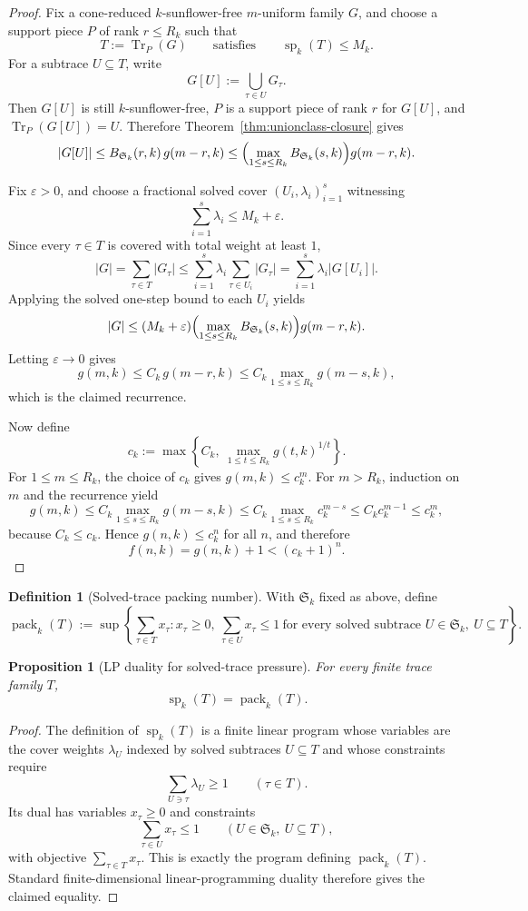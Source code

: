 \documentclass[11pt]{article}
\newtheorem{proposition}[theorem]{Proposition}
\theoremstyle{definition}
\newtheorem{definition}[theorem]{Definition}
\newcommand{\Tr}{\operatorname{Tr}}
\newcommand{\eps}{\varepsilon}
\newcommand{\1}{\mathbf{1}}
\begin{document}
\begin{proof}
Fix a cone-reduced $k$-sunflower-free $m$-uniform family $G$, and choose a support piece $P$ of rank $r\le R_k$ such that
\[
T:=\Tr_P(G)
\qquad\text{satisfies}\qquad
\operatorname{sp}_k(T)\le M_k.
\]
For a subtrace $U\subseteq T$, write
\[
G[U]:=\bigcup_{\tau\in U} G_\tau.
\]
Then $G[U]$ is still $k$-sunflower-free, $P$ is a support piece of rank $r$ for $G[U]$, and $\Tr_P(G[U])=U$. Therefore Theorem~\ref{thm:unionclass-closure} gives
\[
|G[U]|\le B_{\mathfrak S_k}(r,k)\,g(m-r,k)
\le
\Bigl(\max_{1\le s\le R_k} B_{\mathfrak S_k}(s,k)\Bigr) g(m-r,k).
\]

Fix $\eps>0$, and choose a fractional solved cover $(U_i,\lambda_i)_{i=1}^s$ witnessing
\[
\sum_{i=1}^s \lambda_i\le M_k+\eps.
\]
Since every $\tau\in T$ is covered with total weight at least $1$,
\[
|G|
=
\sum_{\tau\in T}|G_\tau|
\le
\sum_{i=1}^s \lambda_i\sum_{\tau\in U_i}|G_\tau|
=
\sum_{i=1}^s \lambda_i |G[U_i]|.
\]
Applying the solved one-step bound to each $U_i$ yields
\[
|G|
\le
(M_k+\eps)\Bigl(\max_{1\le s\le R_k} B_{\mathfrak S_k}(s,k)\Bigr) g(m-r,k).
\]
Letting $\eps\to 0$ gives
\[
g(m,k)\le C_k\,g(m-r,k)\le C_k\max_{1\le s\le R_k} g(m-s,k),
\]
which is the claimed recurrence.

Now define
\[
c_k:=\max\left\{C_k,\ \max_{1\le t\le R_k} g(t,k)^{1/t}\right\}.
\]
For $1\le m\le R_k$, the choice of $c_k$ gives $g(m,k)\le c_k^m$. For $m>R_k$, induction on $m$ and the recurrence yield
\[
g(m,k)\le C_k\max_{1\le s\le R_k} g(m-s,k)
\le
C_k\max_{1\le s\le R_k} c_k^{m-s}
\le
C_k c_k^{m-1}
\le
c_k^m,
\]
because $C_k\le c_k$. Hence $g(n,k)\le c_k^n$ for all $n$, and therefore
\[
f(n,k)=g(n,k)+1<(c_k+1)^n.
\]
\end{proof}

\begin{definition}[Solved-trace packing number]\label{def:solved-trace-packing}
With $\mathfrak S_k$ fixed as above, define
\[
\operatorname{pack}_k(T):=
\sup\left\{
\sum_{\tau\in T} x_\tau :
x_\tau\ge 0,\ 
\sum_{\tau\in U} x_\tau\le 1\ \text{for every solved subtrace }U\in \mathfrak S_k,\ U\subseteq T
\right\}.
\]
\end{definition}

\begin{proposition}[LP duality for solved-trace pressure]\label{prop:solved-trace-pressure-dual}
For every finite trace family $T$,
\[
\operatorname{sp}_k(T)=\operatorname{pack}_k(T).
\]
\end{proposition}

\begin{proof}
The definition of $\operatorname{sp}_k(T)$ is a finite linear program whose variables are the cover weights $\lambda_U$ indexed by solved subtraces $U\subseteq T$ and whose constraints require
\[
\sum_{U\ni \tau}\lambda_U\ge 1
\qquad(\tau\in T).
\]
Its dual has variables $x_\tau\ge 0$ and constraints
\[
\sum_{\tau\in U}x_\tau\le 1
\qquad(U\in \mathfrak S_k,\ U\subseteq T),
\]
with objective $\sum_{\tau\in T}x_\tau$. This is exactly the program defining $\operatorname{pack}_k(T)$. Standard finite-dimensional linear-programming duality therefore gives the claimed equality.
\end{proof}
\end{document}
